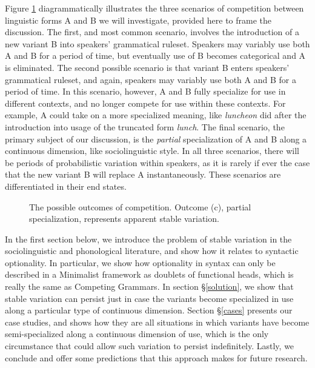 Figure \ref{competition_figure_first} diagrammatically illustrates the three scenarios of competition between linguistic forms A and B we will investigate, provided here to frame the discussion. 
The first, and most common scenario, involves the introduction of a new variant B into speakers' grammatical ruleset.
Speakers may variably use both A and B for a period of time, but eventually use of B becomes categorical and A is eliminated.
The second possible scenario is that variant B enters speakers' grammatical ruleset, and again, speakers may variably use both A and B for a period of time.
In this scenario, however, A and B fully specialize for use in different contexts, and no longer compete for use within these contexts.
For example, A could take on a more specialized meaning, like {\it luncheon} did after the introduction into usage of the truncated form {\it lunch}.
The final scenario, the primary subject of our discussion, is the {\it partial} specialization of A and B along a continuous dimension, like sociolinguistic style.
In all three scenarios, there will be periods of probabilistic variation within speakers, as it is rarely if ever the case that the new variant B will replace A instantaneously.
These scenarios are differentiated in their end states.

\begin{figure}[h!tbp]
	\centering
	\qquad
	\qquad
 \caption{The possible outcomes of competition. Outcome (c), partial specialization, represents apparent stable variation.}
 \label{competition_figure_first}
\end{figure}


  
In the first section below, we introduce the problem of stable variation in the sociolinguistic and phonological literature, and show how it relates to syntactic optionality.
In particular, we show how optionality in syntax can only be described in a Minimalist framework as doublets of functional heads, which is really the same as Competing Grammars.
In section \S\ref{solution}, we show that stable variation can persist just in case the variants become specialized in use along a particular type of continuous dimension.
Section \S\ref{cases} presents our case studies, and shows how they are all situations in which variants have become semi-specialized along a continuous dimension of use, which is the only circumstance that could allow such variation to persist indefinitely.
Lastly, we conclude and offer some predictions that this approach makes for future research.


